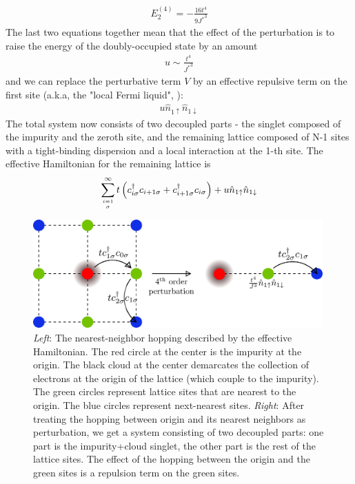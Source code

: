 \documentclass[twoside,11pt]{report}
\numberwithin{equation}{section}
\begin{document}
\begin{equation}\begin{aligned}
	E_2^{(4)} = -\frac{16t^4}{9{J^*}^3}
\end{aligned}\end{equation}
The last two equations together mean that the effect of the perturbation is to raise the energy of the doubly-occupied state by an amount
\begin{equation}\begin{aligned}
	u \sim \frac{t^4}{{J^*}^3}
\end{aligned}\end{equation}
and we can replace the perturbative term \(V\) by an effective repulsive term on the first site (a.k.a, the "local Fermi liquid", \cite{nozieres}):
\begin{equation}\begin{aligned}
	u\hat n_{1 \uparrow}\hat n_{1 \downarrow}
\end{aligned}\end{equation}
The total system now consists of two decoupled parts - the singlet composed of the impurity and the zeroth site, and the remaining lattice composed of N-1 sites with a tight-binding dispersion and a local interaction at the 1-th site. The effective Hamiltonian for the remaining lattice is
\begin{equation}\begin{aligned}
	\sum_{i=1\atop{\sigma}}^\infty t\left(c^\dagger_{i\sigma}c_{i+1 \sigma} + c^\dagger_{i+1 \sigma}c_{i\sigma}\right) + u \hat n_{1 \uparrow} \hat n_{1 \downarrow}
\end{aligned}\end{equation}
\begin{figure}[htpb]
	\centering
	\includegraphics[width=0.99\textwidth]{../figures/lattice_eff.png}
	\caption{\textit{Left}: The nearest-neighbor hopping described by the effective Hamiltonian. The red circle at the center is the impurity at the origin. The black cloud at the center demarcates the collection of electrons at the origin of the lattice (which couple to the impurity). The green circles represent lattice sites that are nearest to the origin. The blue circles represent next-nearest sites. \textit{Right}: After treating the hopping between origin and its nearest neighbors as perturbation, we get a system consisting of two decoupled parts: one part is the impurity+cloud singlet, the other part is the rest of the lattice sites. The effect of the hopping between the origin and the green sites is a repulsion term on the green sites.}
\end{figure}
\end{document}
